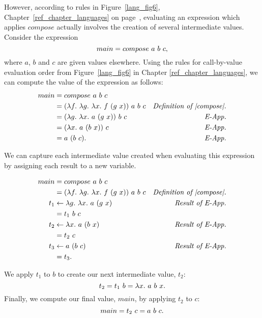 \documentclass[12pt]{report}
\begin{document}

However, according to rules in Figure~\ref{lang_fig6},
Chapter~\ref{ref_chapter_languages} on page~\pageref{lang_fig6},
evaluating an expression which applies $compose$ actually involves the
creation of several intermediate values. Consider the expression
\begin{equation}
  main = compose\ a\ b\ c, \label{mil_eqn4}
\end{equation}
where $a$, $b$ and $c$ are given values elsewhere. Using the
rules for call-by-value evaluation order from Figure~\ref{lang_fig6} in 
Chapter \ref{ref_chapter_languages}, we can compute the value of the expression
as follows:
\begin{align*}
  main &= compose\ a\ b\ c \\
  &= (\lambda f.\ \lambda g.\ \lambda x.\ f\ (g\ x))\ a\ b\ c & \text{\emph{Definition of |compose|.}} \\
  &= (\lambda g.\ \lambda x.\ a\ (g\ x))\ b\ c & \text{\emph{E-App.}} \\
  &= (\lambda x.\ a\ (b\ x))\ c & \text{\emph{E-App.}} \\
  &= a\ (b\ c). & \text{\emph{E-App.}} 
\end{align*}

We can capture each intermediate value created when evaluating this
expression by assigning each result to a new variable. 

\begin{align*}
  main &= compose\ a\ b\ c \\
  &= (\lambda f.\ \lambda g.\ \lambda x.\ f\ (g\ x))\ a\ b\ c & \text{\emph{Definition of |compose|.}} \\
  t_1 &\leftarrow \lambda g.\ \lambda x.\ a\ (g\ x) & \text{\emph{Result of E-App.}}\\
  &= t_1\ b\ c \\
  t_2 &\leftarrow \lambda x.\ a\ (b\ x) & \text{\emph{Result of E-App.}} \\
  &= t_2\ c \\
  t_3 &\leftarrow a\ (b\ c) & \text{\emph{Result of E-App.}} \\
  &= t_3.
\end{align*}

We apply $t_1$ to $b$ to create our next intermediate value, $t_2$:
\begin{equation}
  t_2 = t_1\ b = \lambda x.\ a\ b\ x. \label{mil_eqn2}
\end{equation}
Finally, we compute our final value, $main$, by applying $t_2$ to $c$:
\begin{equation}
  main = t_2\ c = a\ b\ c. \label{mil_eqn3}  
\end{equation}
\end{document}
